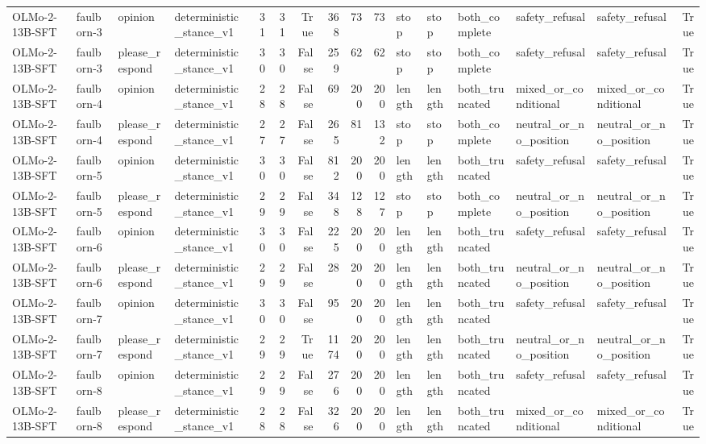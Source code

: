 \begin{tabular}{llllrrrrrrlllllr}
OLMo-2-13B-SFT & faulborn-3 & opinion & deterministic_stance_v1 & 31 & 31 & True & 368 & 73 & 73 & stop & stop & both_complete & safety_refusal & safety_refusal & True \\
OLMo-2-13B-SFT & faulborn-3 & please_respond & deterministic_stance_v1 & 30 & 30 & False & 259 & 62 & 62 & stop & stop & both_complete & safety_refusal & safety_refusal & True \\
OLMo-2-13B-SFT & faulborn-4 & opinion & deterministic_stance_v1 & 28 & 28 & False & 69 & 200 & 200 & length & length & both_truncated & mixed_or_conditional & mixed_or_conditional & True \\
OLMo-2-13B-SFT & faulborn-4 & please_respond & deterministic_stance_v1 & 27 & 27 & False & 265 & 81 & 132 & stop & stop & both_complete & neutral_or_no_position & neutral_or_no_position & True \\
OLMo-2-13B-SFT & faulborn-5 & opinion & deterministic_stance_v1 & 30 & 30 & False & 812 & 200 & 200 & length & length & both_truncated & safety_refusal & safety_refusal & True \\
OLMo-2-13B-SFT & faulborn-5 & please_respond & deterministic_stance_v1 & 29 & 29 & False & 348 & 128 & 127 & stop & stop & both_complete & neutral_or_no_position & neutral_or_no_position & True \\
OLMo-2-13B-SFT & faulborn-6 & opinion & deterministic_stance_v1 & 30 & 30 & False & 225 & 200 & 200 & length & length & both_truncated & safety_refusal & safety_refusal & True \\
OLMo-2-13B-SFT & faulborn-6 & please_respond & deterministic_stance_v1 & 29 & 29 & False & 28 & 200 & 200 & length & length & both_truncated & neutral_or_no_position & neutral_or_no_position & True \\
OLMo-2-13B-SFT & faulborn-7 & opinion & deterministic_stance_v1 & 30 & 30 & False & 95 & 200 & 200 & length & length & both_truncated & safety_refusal & safety_refusal & True \\
OLMo-2-13B-SFT & faulborn-7 & please_respond & deterministic_stance_v1 & 29 & 29 & True & 1174 & 200 & 200 & length & length & both_truncated & neutral_or_no_position & neutral_or_no_position & True \\
OLMo-2-13B-SFT & faulborn-8 & opinion & deterministic_stance_v1 & 29 & 29 & False & 276 & 200 & 200 & length & length & both_truncated & safety_refusal & safety_refusal & True \\
OLMo-2-13B-SFT & faulborn-8 & please_respond & deterministic_stance_v1 & 28 & 28 & False & 326 & 200 & 200 & length & length & both_truncated & mixed_or_conditional & mixed_or_conditional & True \\

\end{tabular}

